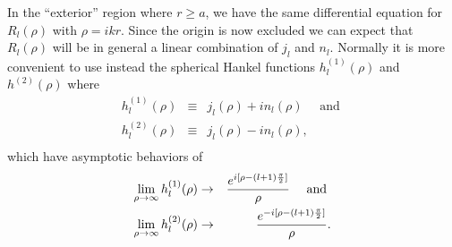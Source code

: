 In the ``exterior'' region where $r\ge a$, we have the same differential equation for $R_l(\rho)$ with $\rho = i k r$. Since the origin is now excluded we can expect that $R_l(\rho)$ will be in general a linear combination of $j_l$ and $n_l$. 
Normally it is more convenient to use instead the spherical Hankel functions $h^{(1)}_l(\rho)$ and $h^{(2)}(\rho)$ where 
\begin{eqnarray*}
h^{(1)}_l(\rho) &\equiv& j_l(\rho) + i  n_l(\rho) \mbox{  ~~ and }\\
h^{(2)}_l(\rho) &\equiv& j_l(\rho) - i  n_l(\rho),\\
\end{eqnarray*}
which have asymptotic behaviors of 
\begin{eqnarray*}
\lim_{\rho\rightarrow\infty} h^{(1)}_l(\rho) &\rightarrow& {e^{i[\rho-(l+1) {\pi\over2} ]} \over \rho} \mbox{  ~~ and }\\
\lim_{\rho\rightarrow\infty} h^{(2)}_l(\rho) &\rightarrow& {e^{-i[\rho-(l+1){\pi\over2} ]} \over \rho}.
\end{eqnarray*}



